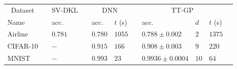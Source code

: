 \documentclass[a0,portrait]{a0poster}
\begin{document}
\begin{multicols}{2}
\begin{center}
    \label{deep_results}
    \centering
    \begin{tabular}{ll ll llll lll}
      \toprule
      \multicolumn{1}{c}{Dataset}  && SV-DKL &&
      \multicolumn{2}{c}{DNN} &&
      \multicolumn{3}{c}{TT-GP}\\

      \cmidrule{1-1}
      \cmidrule{3-3}
      \cmidrule{5-6}
      \cmidrule{8-10}

      Name &&
      acc. && acc. & $t$ (s) &&
      acc. & $d$ & $t$ (s)
      \\
      \midrule



      Airline && 
      $0.781$ && $0.780$ & $1055$ &&
      $0.788 \pm 0.002$ & $2$ & $1375$\\

      CIFAR-10 && 
      $-$ && $0.915$ & $166$ &&
      $0.908 \pm 0.003$ & $9$ & $220$\\

      MNIST && 
      $-$ && $0.993$ & $23$ &&
      $0.9936 \pm 0.0004$ & $10$ & $64$\\
      \bottomrule
    \end{tabular}
\end{center}






\end{multicols}
\end{document}
